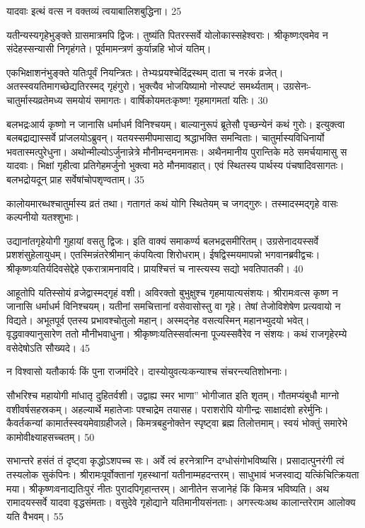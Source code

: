 यादवाः
इत्थं वत्स न वक्तव्यं त्वयाबालिशबुद्धिना।
25

यतीन्यस्यगृहेभुङ्क्ते ग्रासमात्रमपि द्विजः।
तुष्यंति पितरस्सर्वे योलोकास्सहेश्वराः।
श्रीकृष्णःएवमेव न संदेहस्सन्यासी निगृहंगते।
पूर्वमामन्त्रणं कुर्यान्नहि भोजं यतिम्।

एकभिक्षाशनंभुङ्क्ते यतिःपूर्वं नियन्त्रितः।
तेभ्यःप्रयश्चेदिंद्रस्थम् दाता च नरकं व्रजेत्।
अतस्स्वयतिमागच्छेद्यतिरस्मद् गृहंगुरो।
भुक्त्यैव भोजयिष्यामो नोस्पष्टं समर्थ्यताम्।
उग्रसेनः- चातुर्मास्यव्रतेमध्य समयोयं समागतः।
वार्षिकोयमतःकृष्ण! गृहमागमतां यतिः।
30

बलभद्रःआर्य कृष्णो न जानासि धर्माधर्म विनिश्चयम्।
बाल्यानुरूपं ब्रूतेसौ पृच्छन्येनं कथं गुरोः।
इत्युक्त्वा बलबद्राद्यास्सर्वे प्रांजलयोऽब्रुवन्।
यतयस्समीपमासाद्य श्रद्धाभक्ति समन्विताः।
चातुर्मास्यविधिनार्यो भवतास्मत्पुरेधुना।
अथोन्मील्योऽर्जुनान्नेत्रे मौनीमन्दमनामसः।
अथैनमानीय पुरान्तिके मठे समर्चयामासु स यादवाः।
भिक्षां गृहीत्वा प्रतिगेहमर्जुनो भुक्त्वा मठे मौनमावहात्।
एवं स्थितस्य पार्थस्य पंचषादिवसागतः।
बलभद्रोयदून् प्राह सर्वेषांचोपशृण्वताम्।
35

कालोयमारब्धश्चातुर्मास्य व्रतं तथा।
गतागतं कथं योगि स्थितेयम् च जगद्गुरुः।
तस्मादस्मद्गृहे वासः कल्पनीयो यतश्शुभाः।

उद्यानांतगृहेयोगी गुहायां वसतु द्विजः।
इति वाक्यं समाकर्ण्य बलभद्रसमीरितम्।
उग्रसेनादयस्सर्वे प्रशशंसुहेलायुधम्।
एतस्मिन्नंतरेश्रीमान् कंपयित्वा शिरोधराम्।
ईषद्विस्मयमापन्नो भगवानब्रवीद्वचः।
श्रीकृष्णःयतिर्यदिवसेद्देहे एकरात्रामनावदि।
प्रायश्चित्तं च नास्त्यस्य सद्यो भवतिपातकी।
40

आहूतोपि यतिस्सोयं व्रजेद्वास्मद्गृहं वशी।
अविरक्तो बुभुक्षुश्च गृहमायात्यसंशयः।
श्रीरामःवत्स कृष्ण न जानासि धर्माधर्म विनिश्चयम्।
यतीनां समचित्तानां वसेवासोस्तु वा गृहे।
तेषां तेजोविशेषेण प्रत्यवायो न विद्यते।
अभूतपूर्व एतस्य प्रभावश्चोतुलो महान्।
अस्मद्नेह वसत्यस्मिन् महानभ्युदयो भवेत्।
वृद्धवाक्यानुसारेण ततो मौनीभवाधुना।
श्रीकृष्णःयतिस्सर्वात्मना पूज्यस्सवैरेव न संशयः।
कथं राजगृहेरम्ये वसेदेषोऽति सौख्यदे।
45

न विश्वासो यतौकार्यः किं पुना राजमंदिरे।
दास्योयुवत्यःकन्याश्च संचरन्त्यतिशोभनाः।

सौभरिश्च महायोगी मांधातृ दुहितर्वशी।
उद्वाह्य स्मर भाणा” भोगीजात इति शृतम्।
गौतमप्यंबुधौ माग्नो वशीवर्षसहस्रकम्।
अहल्यार्थे महातेजाः पश्चाद्रेम तयासह।
पराशरोपि योगीन्द्रः साक्षादंशो हरेर्मुनिः।
कैवर्तकन्यां कामार्तस्स्वयमेवाग्रहीजले।
किमत्रबहुनोक्तेन स्पृष्ट्वा ब्रह्म तिलोत्तमाम्।
स्वयं भोक्तुं समारेभे कामोवीक्ष्याहसच्चतम्।
50

सभान्तरे हसंतं तं दृष्ट्वा कृद्धोऽशपच्च सः।
अर्वे त्वं हरनेत्राग्नि दग्धोसंगोभविष्यसि।
प्रसादात्पुनरंगी त्वं तस्यलोक सुकंपिनः।
श्रीरामःपूर्वोक्तानां गृहस्थानां यतीनाम्महदन्तरम्।
साधुभावं भजस्वाद्य यत्किंचित्क्रियता मया।
श्रीकृष्णःवनाद्यतिःपुरं नीतः पुरादपिगृहान्तरम्।
आनीतेन सजानेहं किं किमत्र भविष्यति।
अथ रामादयस्सर्वे यादवा वृद्धसंमताः।
वसुदेवे गृहोद्याने यतिमानीयसंनताः।
अगस्त्यःअथ कालान्तरेराम आलोक्य यति वैभवम्।
55

